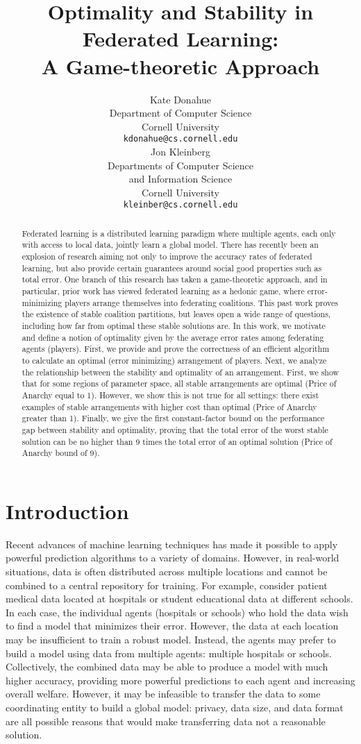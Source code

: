 \documentclass{article}
\title{Optimality and Stability in Federated Learning: \\A Game-theoretic Approach}
\author{%
  Kate Donahue \\
  Department of Computer Science\\
  Cornell University\\
  \texttt{kdonahue@cs.cornell.edu} \\
   \And
   Jon Kleinberg \\
   Departments of Computer Science \\and Information Science \\
   Cornell University\\
   \texttt{kleinber@cs.cornell.edu} \\
}
\begin{document}
\maketitle

\begin{abstract}
Federated learning is a distributed learning paradigm where multiple agents, each only with access to local data, jointly learn a global model. There has recently been an explosion of research aiming not only to improve the accuracy rates of federated learning, but also provide certain guarantees around social good properties such as total error. One branch of this research has taken a game-theoretic approach, and in particular, prior work has viewed federated learning as a hedonic game, where error-minimizing players arrange themselves into federating coalitions. This past work proves the existence of stable coalition partitions, but leaves open a wide range of questions, including how far from optimal these stable solutions are. In this work, we motivate and define a notion of optimality given by the average error rates among federating agents (players). First, we provide and prove the correctness of an efficient algorithm to calculate an optimal (error minimizing) arrangement of players. Next, we analyze the relationship between the stability and optimality of an arrangement. First, we show that for some regions of parameter space, all stable arrangements are optimal (Price of Anarchy equal to 1). However, we show this is not true for all settings: there exist examples of stable arrangements with higher cost than optimal (Price of Anarchy greater than 1). Finally, we give the first constant-factor bound on the performance gap between stability and optimality, proving that the total error of the worst stable solution can be no higher than 9 times the total error of an optimal solution (Price of Anarchy bound of 9).
\end{abstract}

\section{Introduction}

Recent advances of machine learning techniques has made it possible to apply powerful prediction algorithms to a variety of domains. However, in real-world situations, data is often distributed across multiple locations and cannot be combined to a central repository for training. For example, consider patient medical data located at hospitals or student educational data at different schools. In each case, the individual agents (hospitals or schools) who hold the data wish to find a model that minimizes their error. However, the data at each location may be insufficient to train a robust model. Instead, the agents may prefer to build a model using data from multiple agents: multiple hospitals or schools. Collectively, the combined data may be able to produce a model with much higher accuracy, providing more powerful predictions to each agent and increasing overall welfare. However, it may be infeasible to transfer the data to some coordinating entity to build a global model: privacy, data size, and data format are all possible reasons that would make transferring data not a reasonable solution. 
\end{document}
